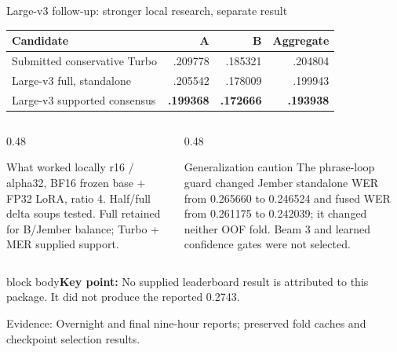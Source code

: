 \documentclass[aspectratio=169,11pt]{beamer}
\newcommand{\takeaway}[1]{\vfill\begin{beamercolorbox}[sep=2mm,wd=\linewidth]{block body}\small\textbf{Key point:} #1\end{beamercolorbox}}
\newcommand{\evidence}[1]{\vspace{1mm}\par{\tiny\color{slate}Evidence: #1\par}}
\begin{document}
\begin{frame}{Large-v3 follow-up: stronger local research, separate result}
\centering\small
\begin{tabular}{@{}lrrr@{}}\toprule
\textbf{Candidate}&\textbf{A}&\textbf{B}&\textbf{Aggregate}\\\midrule
Submitted conservative Turbo&.209778&.185321&.204804\\
Large-v3 full, standalone&.205542&.178009&.199943\\
Large-v3 supported consensus&\textbf{.199368}&\textbf{.172666}&\textbf{.193938}\\\bottomrule
\end{tabular}
\vspace{3mm}
\begin{columns}[T]
\begin{column}{0.48\textwidth}
\begin{block}{What worked locally}
\small r16 / alpha32, BF16 frozen base + FP32 LoRA, ratio 4. Half/full delta soups tested. Full retained for B/Jember balance; Turbo + MER supplied support.
\end{block}
\end{column}
\begin{column}{0.48\textwidth}
\begin{alertblock}{Generalization caution}
\small The phrase-loop guard changed Jember standalone WER from 0.265660 to 0.246524 and fused WER from 0.261175 to 0.242039; it changed neither OOF fold. Beam 3 and learned confidence gates were not selected.
\end{alertblock}
\end{column}
\end{columns}
\takeaway{No supplied leaderboard result is attributed to this package. It did not produce the reported 0.2743.}
\evidence{Overnight and final nine-hour reports; preserved fold caches and checkpoint selection results.}
\end{frame}
\end{document}
